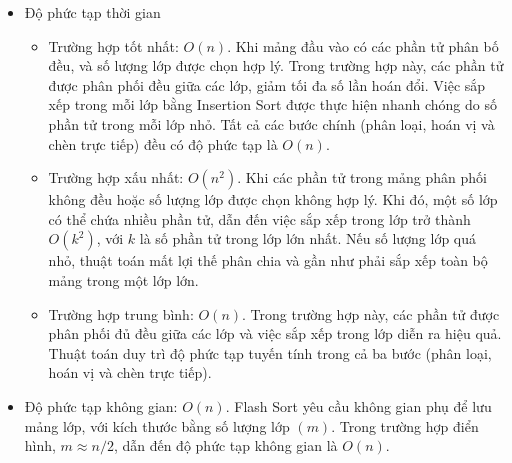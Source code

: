 \begin{itemize}
	\item Độ phức tạp thời gian
	\begin{itemize}[label=$\circ$]
		\item Trường hợp tốt nhất: $O\left(n\right)$. Khi mảng đầu vào có các phần tử 
		phân bố đều, và số lượng lớp được chọn hợp lý. Trong trường hợp 
		này, các phần tử được phân phối đều giữa các lớp, giảm tối đa số 
		lần hoán đổi. Việc sắp xếp trong mỗi lớp bằng Insertion Sort được 
		thực hiện nhanh chóng do số phần tử trong mỗi lớp nhỏ. Tất cả các 
		bước chính (phân loại, hoán vị và chèn trực tiếp) đều có độ phức 
		tạp là $O\left(n\right)$.
		\item Trường hợp xấu nhất: $O\left(n^2\right)$. Khi các phần tử trong mảng phân 
		phối không đều hoặc số lượng lớp được chọn không hợp lý. Khi đó, một 
		số lớp có thể chứa nhiều phần tử, dẫn đến việc sắp xếp trong lớp trở 
		thành $O\left(k^2\right)$, với $k$ là số phần tử trong lớp lớn nhất. Nếu số lượng 
		lớp quá nhỏ, thuật toán mất lợi thế phân chia và gần như phải sắp xếp 
		toàn bộ mảng trong một lớp lớn.
		\item Trường hợp trung bình: $O\left(n\right)$. Trong trường hợp này, các phần 
		tử được phân phối đủ đều giữa các lớp và việc sắp xếp trong lớp 
		diễn ra hiệu quả. Thuật toán duy trì độ phức tạp tuyến tính trong 
		cả ba bước (phân loại, hoán vị và chèn trực tiếp).
	\end{itemize}
	
	\item Độ phức tạp không gian: $O\left(n\right)$. Flash Sort yêu cầu không gian 
	phụ để lưu mảng lớp, với kích thước bằng số lượng lớp $(m)$. Trong 
	trường hợp điển hình, $m \approx n/2$, dẫn đến độ phức tạp không gian 
	là $O\left(n\right)$.
\end{itemize}
